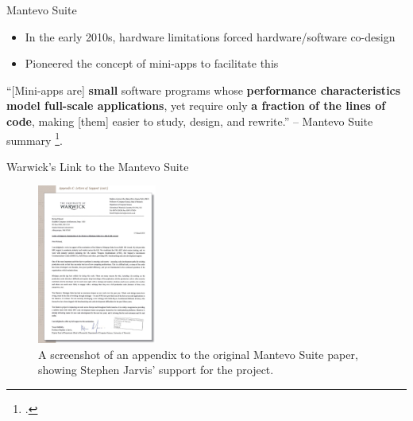 \documentclass[10pt,aspectratio=169]{beamer}
\begin{document}
\begin{frame}{Mantevo Suite}
    \begin{itemize}
        \item In the early 2010s, hardware limitations forced hardware/software co-design
        \item Pioneered the concept of mini-apps to facilitate this
    \end{itemize}
    \vspace*{0.75cm}
    \begin{displayquote}
        \vspace{0.2cm}
        ``[Mini-apps are] \textbf{small} software programs whose \textbf{performance characteristics model full-scale applications}, yet require only \textbf{a fraction of the lines of code}, making [them] easier to study, design, and rewrite.'' -- Mantevo Suite summary \footcite{heroux2013mantevo}.
    \end{displayquote}
\end{frame}

\begin{frame}{Warwick's Link to the Mantevo Suite}
    \begin{figure}[H]
        \includegraphics[width=0.35\textwidth]{images/warwick_mantevo_link.png}
        \caption{A screenshot of an appendix to the original Mantevo Suite paper, showing Stephen Jarvis' support for the project.}
        \label{fig:warwick_mantevo_link}
    \end{figure}
\end{frame}
\end{document}
